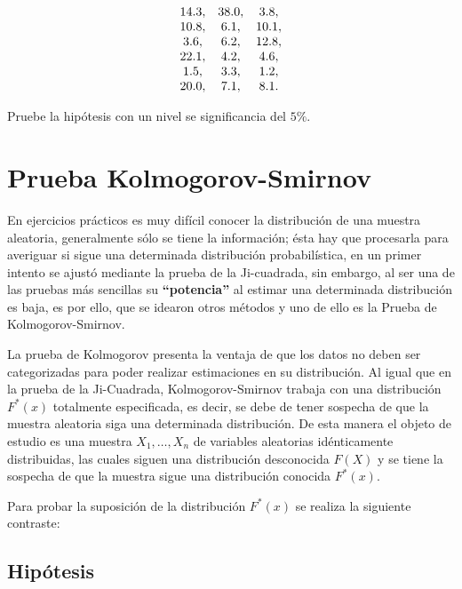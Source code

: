 \documentclass[
  a4paper,
  oneside,
  openany]{book}
\begin{document}
\[
\begin{array}{c c c}
14.3, & 38.0, & 3.8,  \\ 
10.8, & 6.1,& 10.1, \\ 
3.6, & 6.2, & 12.8, \\ 
22.1, & 4.2, & 4.6,  \\ 
1.5, & 3.3, & 1.2,  \\   
20.0, & 7.1,& 8.1.\\
\end{array}
\]

Pruebe la hipótesis con un nivel se significancia del \(5\%\).

\hypertarget{prueba-kolmogorov-smirnov}{%
\chapter{Prueba Kolmogorov-Smirnov}\label{prueba-kolmogorov-smirnov}}

En ejercicios prácticos es muy difícil conocer la distribución de una muestra aleatoria, generalmente
sólo se tiene la información; ésta hay que procesarla para averiguar si sigue una determinada distribución probabilística, en un primer intento se ajustó mediante la prueba de la Ji-cuadrada, sin embargo, al ser una de las pruebas más sencillas su \textbf{``potencia''} al estimar una determinada distribución es baja, es por ello, que se idearon otros métodos y uno de ello es la Prueba de Kolmogorov-Smirnov.

La prueba de Kolmogorov presenta la ventaja de que los datos no deben ser categorizadas para poder realizar estimaciones en su distribución. Al igual que en la prueba de la Ji-Cuadrada, Kolmogorov-Smirnov trabaja con una distribución \(F^*(x)\) totalmente especificada, es decir, se debe de tener sospecha de que la muestra aleatoria siga una determinada distribución. De esta manera el objeto de estudio es una muestra \(X_{1},\ldots,X_{n}\) de variables aleatorias idénticamente distribuidas, las cuales siguen una distribución desconocida \(F(X)\) y se tiene la sospecha de que la muestra sigue una distribución conocida \(F^*(x)\).

Para probar la suposición de la distribución \(F^*(x)\) se realiza la siguiente contraste:

\hypertarget{hipuxf3tesis-14}{%
\section{Hipótesis}\label{hipuxf3tesis-14}}
\end{document}

